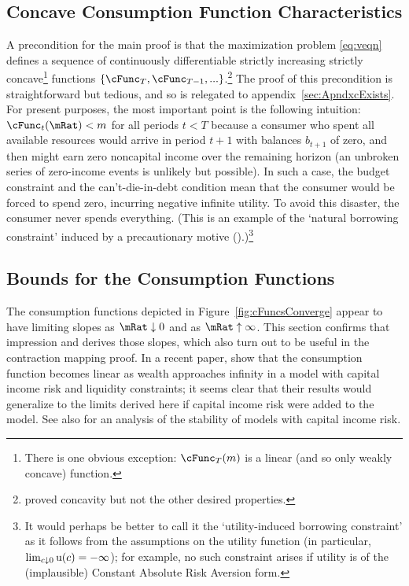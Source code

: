 \documentclass[titlepage]{\econtex}\providecommand{\texname}{BufferStockTheory}%
\begin{document}
\subsection{Concave Consumption Function Characteristics}\label{sec:cExists}

A precondition for the main proof is that the maximization problem \eqref{eq:veqn} defines a sequence of continuously differentiable strictly increasing strictly concave\footnote{There is one obvious exception: $\cFunc_{T}(m)$ is a linear (and so only weakly concave) function.} functions $\{\cFunc_{T},\cFunc_{T-1},...\}$.\footnote{\cite{ckConcavity} proved concavity but not the other desired properties.}  The proof of this precondition is straightforward but tedious, and so is relegated to appendix~\ref{sec:ApndxcExists}.  For present purposes, the most important point is the following intuition: $\cFunc_{t}(\mRat) < m$ for all periods $t < T$ because a consumer who spent all available resources would arrive in period $t+1$ with balances $b_{t+1}$ of zero, and then might earn zero noncapital income over the remaining horizon (an unbroken series of zero-income events is unlikely but possible).  In such a case, the budget constraint and the can't-die-in-debt condition mean that the consumer would be forced to spend zero, incurring negative infinite utility.  To avoid this disaster, the consumer never spends everything.  (This is an example of the `natural borrowing constraint' induced by a precautionary motive (\cite{zeldesStochastic}).)\footnote{It would perhaps be better to call it the `utility-induced borrowing constraint' as it follows from the assumptions on the utility function (in particular, $\lim_{c \downarrow 0} \mathrm{u}(c)=-\infty$); for example, no such constraint arises if utility is of the (implausible) Constant Absolute Risk Aversion form.}

\subsection{Bounds for the Consumption Functions}

The consumption functions depicted in Figure~\ref{fig:cFuncsConverge} appear
to have limiting slopes as $\mRat \downarrow 0$ and as $\mRat \uparrow
\infty$.  This section confirms that impression and derives those
slopes, which also turn out to be useful in the contraction
mapping proof.  In a recent paper, \cite{benhabibWealth} show that the consumption function
becomes linear as wealth approaches infinity in a model with capital income risk and liquidity
constraints; it seems clear that their results would generalize to the limits derived here if capital income risk were added to the model.  See also \cite{mstCapIncFluct} for an analysis of the stability of models with capital income risk.
\end{document}
